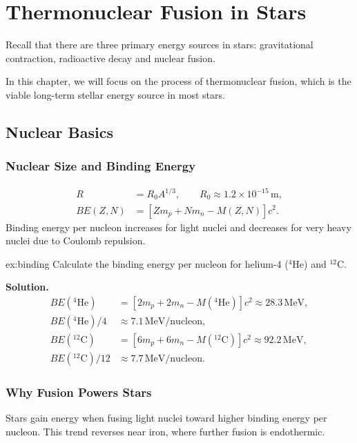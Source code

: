 \chapter{Thermonuclear Fusion in Stars}

Recall that there are three primary energy sources in stars: gravitational contraction, radioactive decay and nuclear fusion. 

In this chapter, we will focus on the process of thermonuclear fusion, which is the viable long-term stellar energy source in most stars.

\section{Nuclear Basics}

\subsection{Nuclear Size and Binding Energy}
\begin{theory}
\begin{align}
    R &= R_0A^{1/3}, \qquad R_0\approx1.2\times10^{-15}\,\text{m}, \\
    BE(Z,N) &= \left[Zm_p+Nm_n-M(Z,N)\right]c^2.
\end{align}
Binding energy per nucleon increases for light nuclei and decreases for very heavy nuclei due to Coulomb repulsion.
\end{theory}

\begin{example}{}{ex:binding}
Calculate the binding energy per nucleon for helium-4 ($^4$He) and $^{12}$C.

\smallskip\textbf{Solution.}
\begin{align*} 
BE(^4\text{He}) &= \left[2m_p + 2m_n - M(^4\text{He})\right]c^2 \approx 28.3\,\text{MeV}, \\
BE(^4\text{He})/4 &\approx 7.1\,\text{MeV/nucleon}, \\
BE(^{12}\text{C}) &= \left[6m_p + 6 m_n - M(^{12}\text{C})\right]c^2 \approx 92.2\,\text{MeV}, \\
BE(^{12}\text{C})/12 &\approx 7.7\,\text{MeV/nucleon}.
\end{align*}   
\end{example}

\subsection{Why Fusion Powers Stars}
\begin{intuition}
Stars gain energy when fusing light nuclei toward higher binding energy per nucleon.
This trend reverses near iron, where further fusion is endothermic.
\end{intuition}

